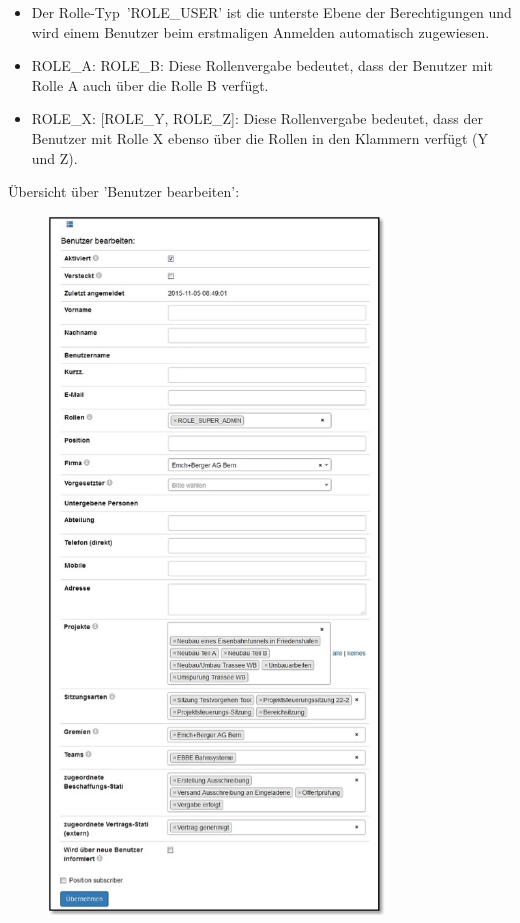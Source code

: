 \begin{itemize}
\item
Der Rolle-Typ~'ROLE\_USER' ist die unterste Ebene der Berechtigungen und wird einem Benutzer beim erstmaligen Anmelden automatisch zugewiesen.
\item
ROLE\_A: ROLE\_B: Diese Rollenvergabe bedeutet, dass der Benutzer mit Rolle A auch über die Rolle B verfügt.
\item
ROLE\_X: [ROLE\_Y, ROLE\_Z]: Diese Rollenvergabe bedeutet, dass der Benutzer mit Rolle X ebenso über die Rollen in den Klammern verfügt (Y und Z).
\end{itemize}

Übersicht über 'Benutzer bearbeiten':

\vspace{\baselineskip}
\vspace{\baselineskip}

\begin{figure}
\vspace{-55pt}
\includegraphics[height=185mm]{../chapters/14_Benutzerverwaltung/pictures/14-1-1_BenutzerBearbeiten.jpg}
\end{figure}

